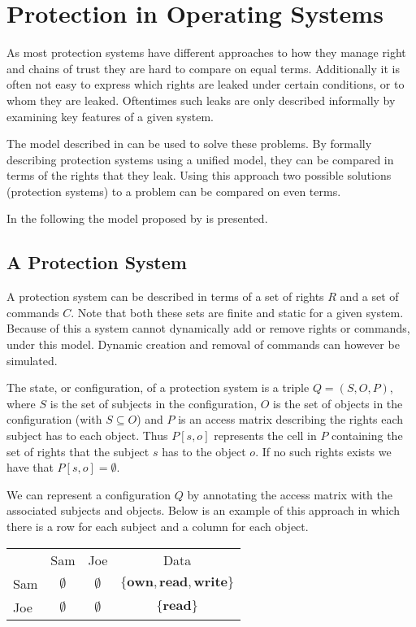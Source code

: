 \section{Protection in Operating Systems}
As most protection systems have different approaches to how they manage right and chains of trust they are hard to compare on equal terms.
Additionally it is often not easy to express which rights are leaked under certain conditions, or to whom they are leaked.
Oftentimes such leaks are only described informally by examining key features of a given system.

The model described in \cite{HRU} can be used to solve these problems.
By formally describing protection systems using a unified model, they can be compared in terms of the rights that they leak.
Using this approach two possible solutions (protection systems) to a problem can be compared on even terms.

In the following the model proposed by \cite{HRU} is presented.

\subsection{A Protection System}
A protection system can be described in terms of a set of rights $R$ and a set of commands $C$.
Note that both these sets are finite and static for a given system.
Because of this a system cannot dynamically add or remove rights or commands, under this model.
Dynamic creation and removal of commands can however be simulated.

The state, or configuration, of a protection system is a triple $Q = (S, O, P)$, where $S$ is the set of subjects in the configuration, $O$ is the set of objects in the configuration (with $S \subseteq O$) and $P$ is an access matrix describing the rights each subject has to each object.
Thus $P[s, o]$ represents the cell in $P$ containing the set of rights that the subject $s$ has to the object $o$.
If no such rights exists we have that $P[s,o] = \emptyset$.

We can represent a configuration $Q$ by annotating the access matrix with the associated subjects and objects.
Below is an example of this approach in which there is a row for each subject and a column for each object.

\begin{center}
\begin{tabular}{l|c|c|c|}
\multicolumn{1}{c}{} & \multicolumn{1}{c}{Sam} & \multicolumn{1}{c}{Joe} & \multicolumn{1}{c}{Data} \\\cline{2-4}
Sam & $\emptyset$ & $\emptyset$ & $\{\textbf{own}, \textbf{read}, \textbf{write}\}$ \\\cline{2-4}
Joe & $\emptyset$ & $\emptyset$ & $\{\textbf{read}\}$ \\\cline{2-4}
\end{tabular}
\end{center}

